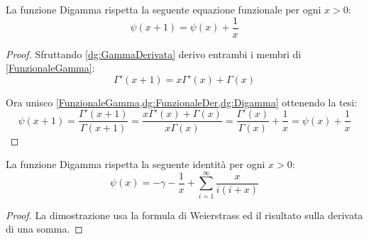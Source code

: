 \begin{lemma}\label{dg:DigammaFunzionale}
	La funzione Digamma rispetta la seguente equazione funzionale per ogni $x>0$:
	\begin{equation*}
		\psi(x+1)=\psi(x)+\frac 1x
	\end{equation*}
\end{lemma}
\begin{proof}
	Sfruttando \cref{dg:GammaDerivata} derivo entrambi i membri di \cref{FunzionaleGamma}:
	\begin{equation}\label{dg:FunzionaleDer}
		\Gamma'(x+1)=x\Gamma'(x)+\Gamma(x)
	\end{equation}
	
	Ora unisco \cref{FunzionaleGamma,dg:FunzionaleDer,dg:Digamma} ottenendo la tesi:
	\begin{equation*}
		\psi(x+1)=\frac{\Gamma'(x+1)}{\Gamma(x+1)}=\frac{x\Gamma'(x)+\Gamma(x)}{x\Gamma(x)}=
		\frac{\Gamma'(x)}{\Gamma(x)}+\frac 1x=\psi(x)+\frac 1x
	\end{equation*}
\end{proof}

\begin{lemma}\label{dg:DigammaId}
	La funzione Digamma rispetta la seguente identità per ogni $x>0$:
	\begin{equation*}
		\psi(x)=-\gamma-\frac 1x +\sum_{i=1}^{\infty} \frac x{i(i+x)}
	\end{equation*}
\end{lemma}
\begin{proof}
	La dimostrazione usa la formula di Weierstrass ed il risultato sulla derivata di una somma.
\end{proof}






